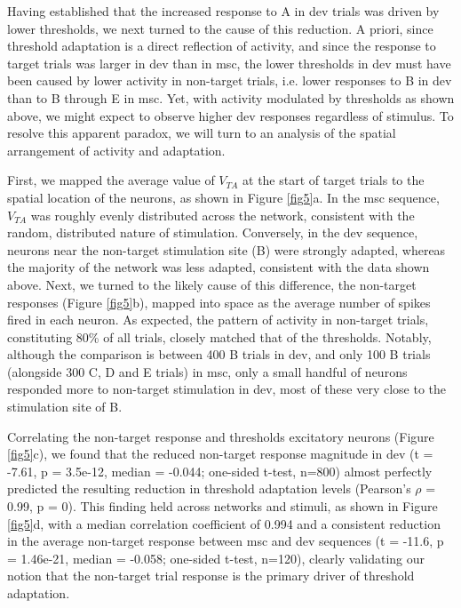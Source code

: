 \documentclass[pdflatex,referee,iicol,sn-basic]{sn-jnl}
\theoremstyle{thmstyleone}%
\theoremstyle{thmstyletwo}%
\theoremstyle{thmstylethree}%
\begin{document}
Having established that the increased response to A in dev trials was driven by lower thresholds, we next turned to the cause of this reduction. A priori, since threshold adaptation is a direct reflection of activity, and since the response to target trials was larger in dev than in msc, the lower thresholds in dev must have been caused by lower activity in non-target trials, i.e. lower responses to B in dev than to B through E in msc. Yet, with activity modulated by thresholds as shown above, we might expect to observe higher dev responses regardless of stimulus. To resolve this apparent paradox, we will turn to an analysis of the spatial arrangement of activity and adaptation.

First, we mapped the average value of $V_{TA}$ at the start of target trials to the spatial location of the neurons, as shown in Figure \ref{fig5}a. In the msc sequence, $V_{TA}$ was roughly evenly distributed across the network, consistent with the random, distributed nature of stimulation. Conversely, in the dev sequence, neurons near the non-target stimulation site (B) were strongly adapted, whereas the majority of the network was less adapted, consistent with the data shown above.
Next, we turned to the likely cause of this difference, the non-target responses (Figure \ref{fig5}b), mapped into space as the average number of spikes fired in each neuron. As expected, the pattern of activity in non-target trials, constituting 80\% of all trials, closely matched that of the thresholds. Notably, although the comparison is between 400 B trials in dev, and only 100 B trials (alongside 300 C, D and E trials) in msc, only a small handful of neurons responded more to non-target stimulation in dev, most of these very close to the stimulation site of B.

Correlating the non-target response and thresholds excitatory neurons (Figure \ref{fig5}c), we found that the reduced non-target response magnitude in dev (t = -7.61, p = 3.5e-12, median = -0.044; one-sided t-test, n=800) almost perfectly predicted the resulting reduction in threshold adaptation levels (Pearson's $\rho$ = 0.99, p = 0).
This finding held across networks and stimuli, as shown in Figure \ref{fig5}d, with a median correlation coefficient of 0.994 and a consistent reduction in the average non-target response between msc and dev sequences (t = -11.6, p = 1.46e-21, median = -0.058; one-sided t-test, n=120), clearly validating our notion that the non-target trial response is the primary driver of threshold adaptation.
\end{document}
